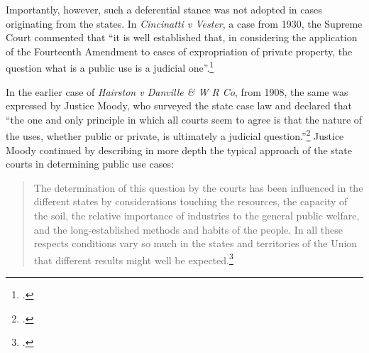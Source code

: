 Importantly, however, such a deferential stance was not adopted in cases originating from the states. In {\it Cincinatti v Vester}, a case from 1930, the Supreme Court commented that ``it is well established that, in considering the application of the Fourteenth Amendment to cases of expropriation of private property, the question what is a public use is a judicial one''.\footcite[447]{vester30} %


In the earlier case of {\it Hairston v Danville \& W R Co}, from 1908, the same was expressed by Justice Moody, who surveyed the state case law and declared that ``the one and only principle in which all courts seem to agree is that the nature of the uses, whether public or private, is ultimately a judicial question.''\footcite[606]{hairston08} Justice Moody continued by describing in more depth the typical approach of the state courts in determining public use cases:

\begin{quote}
The determination of this question by the courts has been influenced in the different states by considerations touching the resources, the capacity of the soil, the relative importance of industries to the general public welfare, and the long-established methods and habits of the people. In all these respects conditions vary so much in the states and territories of the Union that different results might well be expected.\footcite[606]{hairston08}
\end{quote}

